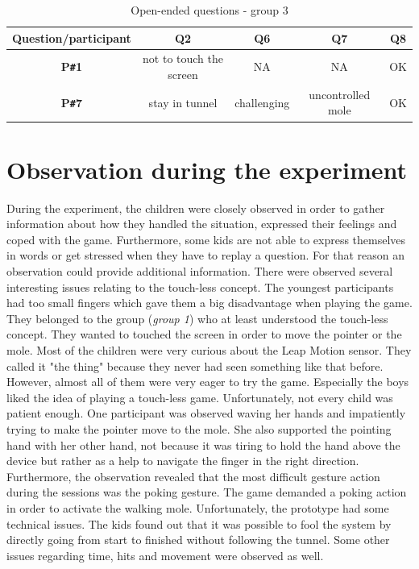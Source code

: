 \begin{table}[!ht]
    \centering
    \begin{tabular}{c|c|c|c|c}
    \hline
    \multicolumn{1}{|c|}{\textbf{Question/participant}} &
    \multicolumn{1}{c|}{\textbf{Q2}} &
    \multicolumn{1}{c|}{\textbf{Q6}} &
    \multicolumn{1}{c|}{\textbf{Q7}} &
    \multicolumn{1}{c|}{\textbf{Q8}} \\ \hline
    \multicolumn{1}{|c|}{\textbf{P\texttt{\#}1}} &
    \multicolumn{1}{c|}{not to touch the screen} &
    \multicolumn{1}{c|}{NA} &
    \multicolumn{1}{c|}{NA} &
    \multicolumn{1}{c|}{OK} \\ \hline
    \multicolumn{1}{|c|}{\textbf{P\texttt{\#}7}} &
    \multicolumn{1}{c|}{stay in tunnel} &
    \multicolumn{1}{c|}{challenging} &
    \multicolumn{1}{c|}{uncontrolled mole} &
    \multicolumn{1}{c|}{OK} \\ \hline
    \end{tabular}
    \caption{Open-ended questions - group 3}
    \label{tab:openendedquestiongroup3}
\end{table}

\section{Observation during the experiment}
During the experiment, the children were closely observed in order to gather information about how they handled the situation, expressed their feelings and coped with the game. Furthermore, some kids are not able to express themselves in words or get stressed when they have to replay a question. For that reason an observation could provide additional information.
There were observed several interesting issues relating to the touch-less concept. The youngest participants had too small fingers which gave them a big disadvantage when playing the game. They belonged to the group (\textit{group 1}) who at least understood the touch-less concept. They wanted to touched the screen in order to move the pointer or the mole. 
Most of the children were very curious about the Leap Motion sensor. They called it "the thing" because they never had seen something like that before. However, almost all of them were very eager to try the game. Especially the boys liked the idea of playing a touch-less game.
Unfortunately, not every child was patient enough. One participant was observed waving her hands and impatiently trying to make the pointer move to the mole. She also supported the pointing hand with her other hand, not because it was tiring to hold the hand above the device but rather as a help to navigate the finger in the right direction.  
Furthermore, the observation revealed that the most difficult gesture action during the sessions was the poking gesture. The game demanded a poking action in order to activate the walking mole.
Unfortunately, the prototype had some technical issues. The kids found out that it was possible to fool the system by directly going from start to finished without following the tunnel. Some other issues regarding time, hits and movement were observed as well. 

